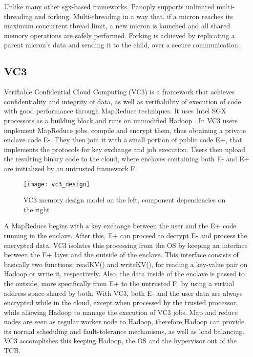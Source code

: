 Unlike many other \gls{sgx}-based frameworks, Panoply supports unlimited multi-threading and forking. Multi-threading in a way that, if a micron reaches its maximum concurrent thread limit, a new micron is launched and all shared memory operations are safely performed. Forking is achieved by replicating a parent micron's data and sending it to the child, over a secure communication. 


\subsection{VC3}
\label{ssec:vc3_mapreduce}

Verifiable Confidential Cloud Computing (VC3) \cite{vc3Paper} is a framework that achieves confidentiality and integrity of data, as well as verifiability of execution of code with good performance through MapReduce \cite{mapReduce} techniques. It uses Intel SGX processors as a building block and runs on unmodified Hadoop \cite{hadoop}.
In VC3 users implement MapReduce jobs, compile and encrypt them, thus obtaining a private enclave code E-. They then join it with a small portion of public code E+, that implements the protocols for key exchange and job execution.
Users then upload the resulting binary code to the cloud, where enclaves containing both E- and E+ are initialized by an untrusted framework F. 

\begin{figure}[htbp]
	\centering
	{\texttt{[image: vc3\_design]}}%
	\caption{VC3 memory design model on the left, component dependencies on the right}
\end{figure}

A MapReduce begins with a key exchange between the user and the E+ code running in the enclave. After this, E+ can proceed to decrypt E- and process the encrypted data. VC3 isolates this processing from the OS by keeping an interface between the E+ layer and the outside of the enclave. This interface consists of basically two functions: readKV() and writeKV(), for reading a key-value pair on Hadoop or write it, respectively. Also, the data inside of the enclave is passed to the outside, more specifically from E+ to the untrusted F, by using a virtual address space shared by both.
With VC3, both E- and the user data are always encrypted while in the cloud, except when processed by the trusted processor, while allowing Hadoop to manage the execution of VC3 jobs. Map and reduce nodes are seen as regular worker node to Hadoop, therefore Hadoop can provide its normal scheduling and fault-tolerance mechanisms, as well as load balancing. VC3 accomplishes this keeping Hadoop, the OS and the hypervisor out of the TCB.

